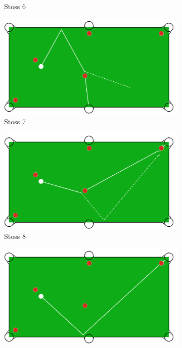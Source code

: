 \begin{figure}[h!]
\begin{subfigure}[b]{0.3\textwidth}
        \caption{Stoss 6}
        \label{fig:situation_rail_1_solution_6}
    \end{subfigure}
    \hfill
    \begin{subfigure}[b]{0.3\textwidth}
        \centering
        \includegraphics[width=1.0\linewidth]{../common/04_results/resources/simple_search/situation_diverse_solution_rail_7.PNG}
        \caption{Stoss 7}
        \label{fig:situation_rail_1_solution_7}
    \end{subfigure}
    \hfill
    \begin{subfigure}[b]{0.3\textwidth}
        \centering
        \includegraphics[width=1.0\linewidth]{../common/04_results/resources/simple_search/situation_diverse_solution_rail_8.PNG}
        \caption{Stoss 8}
        \label{fig:situation_rail_1_solution_8}
    \end{subfigure}
    \hfill
    \begin{subfigure}[b]{0.3\textwidth}
        \centering
        \includegraphics[width=1.0\linewidth]{../common/04_results/resources/simple_search/situation_diverse_solution_rail_9.PNG}

\end{subfigure}
\end{figure}
